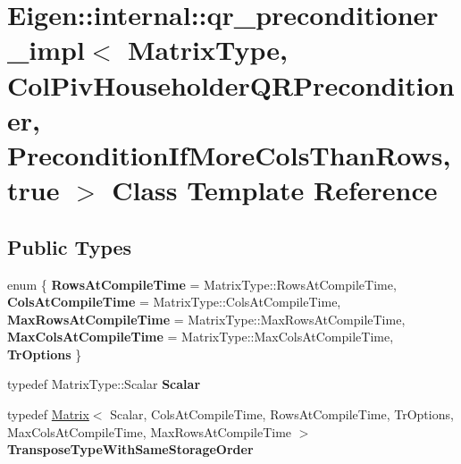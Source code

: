 \hypertarget{class_eigen_1_1internal_1_1qr__preconditioner__impl_3_01_matrix_type_00_01_col_piv_householder_q9febbd0c27c13f65b619ca11d9f35cb8}{}\section{Eigen\+::internal\+::qr\+\_\+preconditioner\+\_\+impl$<$ Matrix\+Type, Col\+Piv\+Householder\+Q\+R\+Preconditioner, Precondition\+If\+More\+Cols\+Than\+Rows, true $>$ Class Template Reference}
\label{class_eigen_1_1internal_1_1qr__preconditioner__impl_3_01_matrix_type_00_01_col_piv_householder_q9febbd0c27c13f65b619ca11d9f35cb8}
\subsection*{Public Types}
\begin{DoxyCompactItemize}
\item 
\mbox{\label{class_eigen_1_1internal_1_1qr__preconditioner__impl_3_01_matrix_type_00_01_col_piv_householder_q9febbd0c27c13f65b619ca11d9f35cb8_a577eab56035c18dac40ac82597863eb1}} 
enum \{ \newline
{\bfseries Rows\+At\+Compile\+Time} = Matrix\+Type\+::Rows\+At\+Compile\+Time, 
{\bfseries Cols\+At\+Compile\+Time} = Matrix\+Type\+::Cols\+At\+Compile\+Time, 
{\bfseries Max\+Rows\+At\+Compile\+Time} = Matrix\+Type\+::Max\+Rows\+At\+Compile\+Time, 
{\bfseries Max\+Cols\+At\+Compile\+Time} = Matrix\+Type\+::Max\+Cols\+At\+Compile\+Time, 
\newline
{\bfseries Tr\+Options}
 \}
\item 
\mbox{\label{class_eigen_1_1internal_1_1qr__preconditioner__impl_3_01_matrix_type_00_01_col_piv_householder_q9febbd0c27c13f65b619ca11d9f35cb8_a85b6c5ee23a5920211586a22d33c73a9}} 
typedef Matrix\+Type\+::\+Scalar {\bfseries Scalar}
\item 
\mbox{\label{class_eigen_1_1internal_1_1qr__preconditioner__impl_3_01_matrix_type_00_01_col_piv_householder_q9febbd0c27c13f65b619ca11d9f35cb8_a58578c89efb3fbe5e0356412694f873f}} 
typedef \mbox{\hyperlink{class_eigen_1_1_matrix}{Matrix}}$<$ Scalar, Cols\+At\+Compile\+Time, Rows\+At\+Compile\+Time, Tr\+Options, Max\+Cols\+At\+Compile\+Time, Max\+Rows\+At\+Compile\+Time $>$ {\bfseries Transpose\+Type\+With\+Same\+Storage\+Order}
\end{DoxyCompactItemize}
